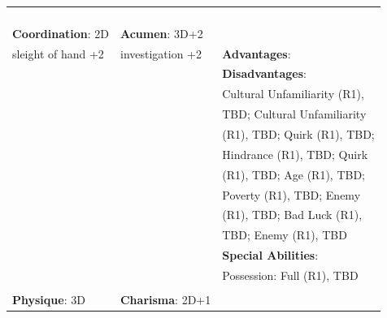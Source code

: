 \documentclass[10pt]{article}
\begin{document}
\begin{table}
\begin{tabular}{m{156pt} m{156pt} m{156pt}}
 \hrulefill &  \hrulefill & \\

 \hrulefill &  \hrulefill & \\

 \hrulefill &  \hrulefill & \\

 \hrulefill &  \hrulefill & \\


\textbf{Coordination}: 2D \hrulefill & \textbf{Acumen}: 3D+2 \hrulefill     & \hrulefill \\

sleight of hand   +2 \hrulefill & investigation     +2 \hrulefill & \textbf{Advantages}: \hrulefill \\

 \hrulefill &  \hrulefill & \textbf{Disadvantages}: \hrulefill \\

 \hrulefill &  \hrulefill & Cultural Unfamiliarity (R1), \hrulefill \\

 \hrulefill &  \hrulefill & TBD; Cultural Unfamiliarity \hrulefill \\

 \hrulefill &  \hrulefill & (R1), TBD; Quirk (R1), TBD; \hrulefill \\

 \hrulefill &  \hrulefill & Hindrance (R1), TBD; Quirk \hrulefill \\

 \hrulefill &  \hrulefill & (R1), TBD; Age (R1), TBD; \hrulefill \\

 \hrulefill &  \hrulefill & Poverty (R1), TBD; Enemy \hrulefill \\

 \hrulefill &  \hrulefill & (R1), TBD; Bad Luck (R1), \hrulefill \\

 \hrulefill &  \hrulefill & TBD; Enemy (R1), TBD \hrulefill \\

 \hrulefill &  \hrulefill & \textbf{Special Abilities}: \hrulefill \\

 \hrulefill &  \hrulefill & Possession: Full (R1), TBD \hrulefill \\

 \hrulefill &  \hrulefill &  \hrulefill \\


\textbf{Physique}: 3D \hrulefill & \textbf{Charisma}: 2D+1 \hrulefill     &  \hrulefill \\


\end{tabular}
\end{table}
\end{document}
